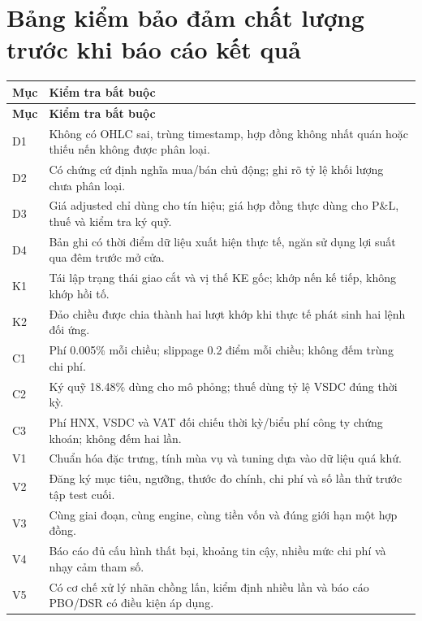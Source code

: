 \documentclass[12pt,a4paper,oneside]{article}
\begin{document}
\section{Bảng kiểm bảo đảm chất lượng trước khi báo cáo kết quả}
\begin{longtable}{p{1.3cm}p{12.8cm}}
\toprule\textbf{Mục}&\textbf{Kiểm tra bắt buộc}\\\midrule\endfirsthead
\toprule\textbf{Mục}&\textbf{Kiểm tra bắt buộc}\\\midrule\endhead
D1& Không có OHLC sai, trùng timestamp, hợp đồng không nhất quán hoặc thiếu nến không được phân loại.\\
D2& Có chứng cứ định nghĩa mua/bán chủ động; ghi rõ tỷ lệ khối lượng chưa phân loại.\\
D3& Giá adjusted chỉ dùng cho tín hiệu; giá hợp đồng thực dùng cho P\&L, thuế và kiểm tra ký quỹ.\\
D4& Bản ghi có thời điểm dữ liệu xuất hiện thực tế, ngăn sử dụng lợi suất qua đêm trước mở cửa.\\
K1& Tái lập trạng thái giao cắt và vị thế KE gốc; khớp nến kế tiếp, không khớp hồi tố.\\
K2& Đảo chiều được chia thành hai lượt khớp khi thực tế phát sinh hai lệnh đối ứng.\\
C1& Phí 0.005\% mỗi chiều; slippage 0.2 điểm mỗi chiều; không đếm trùng chi phí.\\
C2& Ký quỹ 18.48\% dùng cho mô phỏng; thuế dùng tỷ lệ VSDC đúng thời kỳ.\\
C3& Phí HNX, VSDC và VAT đối chiếu thời kỳ/biểu phí công ty chứng khoán; không đếm hai lần.\\
V1& Chuẩn hóa đặc trưng, tính mùa vụ và tuning dựa vào dữ liệu quá khứ.\\
V2& Đăng ký mục tiêu, ngưỡng, thước đo chính, chi phí và số lần thử trước tập test cuối.\\
V3& Cùng giai đoạn, cùng engine, cùng tiền vốn và đúng giới hạn một hợp đồng.\\
V4& Báo cáo đủ cấu hình thất bại, khoảng tin cậy, nhiều mức chi phí và nhạy cảm tham số.\\
V5& Có cơ chế xử lý nhãn chồng lấn, kiểm định nhiều lần và báo cáo PBO/DSR có điều kiện áp dụng.\\
\bottomrule
\end{longtable}
\end{document}
